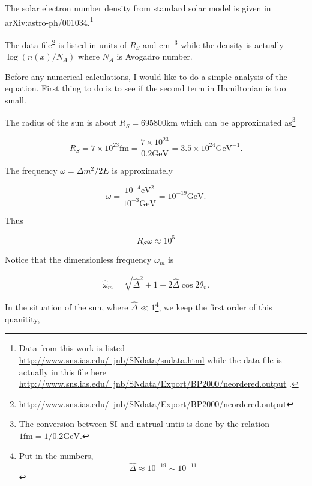 \documentclass{tufte-handout}
\begin{document}
The solar electron number density from standard solar model is given in arXiv:astro-ph/001034.\footnote{Data from this work is listed \href{http://www.sns.ias.edu/~jnb/SNdata/sndata.html}{http://www.sns.ias.edu/~jnb/SNdata/sndata.html} while the data file is actually in this file here \href{http://www.sns.ias.edu/~jnb/SNdata/Export/BP2000/neordered.output}{http://www.sns.ias.edu/~jnb/SNdata/Export/BP2000/neordered.output} .}

The data file\footnote{\href{http://www.sns.ias.edu/~jnb/SNdata/Export/BP2000/neordered.output}{http://www.sns.ias.edu/~jnb/SNdata/Export/BP2000/neordered.output} } is listed in units of $R_S$ and $\mathrm{cm}^{-3}$ while the density is actually $\log(n(x)/N_A)$ where $N_A$ is Avogadro number.

Before any numerical calculations, I would like to do a simple analysis of the equation. First thing to do is to see if the second term in Hamiltonian is too small.

The radius of the sun is about $R_S = 695800\mathrm{km}$ which can be approximated as\footnote{The conversion between SI and natrual untis is done by the relation $1\mathrm{fm}=1/0.2\mathrm{GeV}$.}

\begin{equation*}
R_S = 7\times 10^{23}\mathrm{fm}= \frac{7\times 10^{23} }{0.2 \mathrm{GeV} } = 3.5 \times 10^{24} \mathrm{GeV^{-1}} .
\end{equation*}

The frequency $\omega = \Delta m^2/2E$ is approximately

\begin{equation*}
\omega = \frac{10^{-4} \mathrm{eV^2}}{10^{-3}\mathrm{GeV}} = 10^{-19} \mathrm{GeV}.
\end{equation*}

Thus 

\begin{equation*}
R_S \omega \approx  10^5
\end{equation*}


Notice that the dimensionless frequency $\omega_m$ is

\begin{equation*}
\hat \omega_m  = \sqrt{\hat\Delta ^2 + 1 - 2 \hat\Delta \cos 2\theta_v }.
\end{equation*}

In the situation of the sun, where $\hat\Delta \ll 1$\footnote{
Put in the numbers,
\begin{equation*}
\hat\Delta \approx 10^{-19} \sim 10^{-11}
\end{equation*}
}, we keep the first order of this quanitity,
\end{document}
